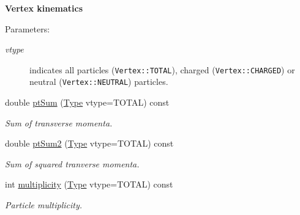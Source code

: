\begin{Indent}{\bf Vertex kinematics}\par
{\em \begin{Desc}
\item[Parameters:]
\begin{description}
\item[{\em vtype}]indicates all particles ({\tt Vertex::TOTAL}), charged ({\tt Vertex::CHARGED}) or neutral ({\tt Vertex::NEUTRAL}) particles. \end{description}
\end{Desc}
}\begin{CompactItemize}
\item 
\hypertarget{classVertex_36e443e74b0cdd1d07407c0dfef28b8d}{
double \hyperlink{classVertex_36e443e74b0cdd1d07407c0dfef28b8d}{pt\-Sum} (\hyperlink{classVertex_ca819079d9d940f86b1f6ea1469aed20}{Type} vtype=TOTAL) const }
\label{classVertex_36e443e74b0cdd1d07407c0dfef28b8d}

\begin{CompactList}\small\item\em Sum of transverse momenta. \item\end{CompactList}\item 
\hypertarget{classVertex_7a1e9c544ddc4a14854a7add382f75f9}{
double \hyperlink{classVertex_7a1e9c544ddc4a14854a7add382f75f9}{pt\-Sum2} (\hyperlink{classVertex_ca819079d9d940f86b1f6ea1469aed20}{Type} vtype=TOTAL) const }
\label{classVertex_7a1e9c544ddc4a14854a7add382f75f9}

\begin{CompactList}\small\item\em Sum of squared tranverse momenta. \item\end{CompactList}\item 
\hypertarget{classVertex_7e414546c67cf36095f211ed9b38b15a}{
int \hyperlink{classVertex_7e414546c67cf36095f211ed9b38b15a}{multiplicity} (\hyperlink{classVertex_ca819079d9d940f86b1f6ea1469aed20}{Type} vtype=TOTAL) const }
\label{classVertex_7e414546c67cf36095f211ed9b38b15a}

\begin{CompactList}\small\item\em Particle multiplicity. \item\end{CompactList}\end{CompactItemize}
\end{Indent}
